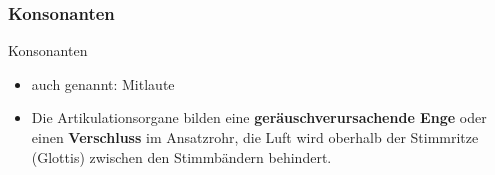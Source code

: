 \subsubsection{Konsonanten}
\begin{frame}{Konsonanten}

	\begin{itemize}
		\item auch genannt: Mitlaute
		
		\item Die Artikulationsorgane bilden eine \textbf{geräuschverursachende Enge} oder einen \textbf{Verschluss} im Ansatzrohr, \dash die Luft wird oberhalb der Stimmritze (Glottis) zwischen den Stimmbändern behindert.
	\end{itemize}
	
\end{frame}


